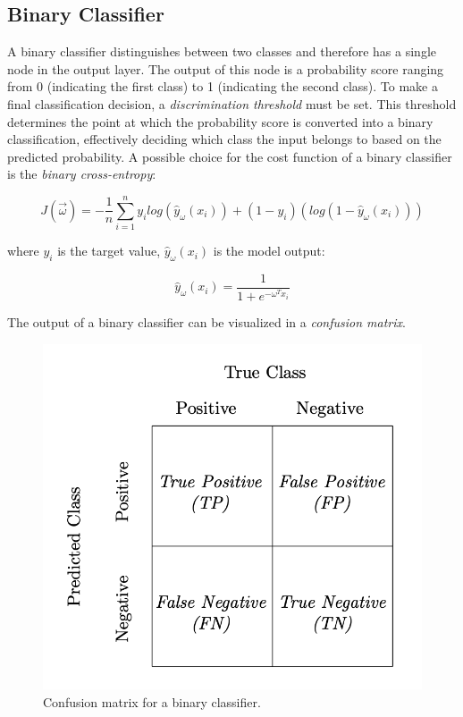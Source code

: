 \subsection{Binary Classifier}

A binary classifier distinguishes between two classes and therefore has a single node in the output layer. The output of this 
node is a probability score ranging from 0 (indicating the first class) to 1 (indicating the second class). To make a final 
classification decision, a \textit{discrimination threshold} must be set. This threshold determines the point at which the probability score is 
converted into a binary classification, effectively deciding which class the input belongs to based on the predicted probability.
A possible choice for the cost function of a binary classifier is the \textit{binary cross-entropy}:

\begin{equation}
J(\vec{\omega}) = - \frac{1}{n} \sum_{i=1}^n y_i log(\hat{y}_\omega(x_i)) + (1-y_i)(log(1-\hat{y}_\omega(x_i)))
\end{equation}

where $y_i$ is the target value, $\hat{y}_\omega(x_i)$ is the model output:

\begin{equation}
\hat{y}_{\omega}(x_i) = \frac{1}{1+e^{-\omega^Tx_i}}
\end{equation}

The output of a binary classifier can be visualized in a \textit{confusion matrix}.

\begin{figure}[h]
\centering
\includegraphics[scale=0.5]{Chapters/Chapter2/confusionmatrixdef.png}
\caption{Confusion matrix for a binary classifier.}
\end{figure}

